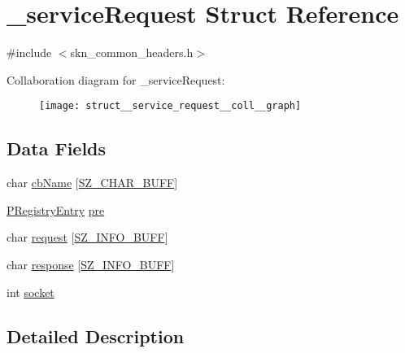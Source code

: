 \hypertarget{struct__service_request}{}\section{\+\_\+service\+Request Struct Reference}
\label{struct__service_request}


{\ttfamily \#include $<$skn\+\_\+common\+\_\+headers.\+h$>$}



Collaboration diagram for \+\_\+service\+Request\+:
\nopagebreak
\begin{figure}[H]
\begin{center}
\leavevmode
\texttt{[image: struct\_\_service\_request\_\_coll\_\_graph]}
\end{center}
\end{figure}
\subsection*{Data Fields}
\begin{DoxyCompactItemize}
\item 
char \hyperlink{struct__service_request_aab7831722782ba05f0c94087598a941e}{cb\+Name} \mbox{[}\hyperlink{skn__common__headers_8h_a8d2978ad614b0de81c60483e706d9306}{S\+Z\+\_\+\+C\+H\+A\+R\+\_\+\+B\+U\+F\+F}\mbox{]}
\item 
\hyperlink{skn__common__headers_8h_ac4f78e564b456af8e033cbc1275db23e}{P\+Registry\+Entry} \hyperlink{struct__service_request_acf8d45e7f9cb65b555217aae74cd72c5}{pre}
\item 
char \hyperlink{struct__service_request_ad347b2a07388ec9d9d33756f1a1ef235}{request} \mbox{[}\hyperlink{skn__common__headers_8h_a442d5e93bd9c9d8eb4532aba62b5f86c}{S\+Z\+\_\+\+I\+N\+F\+O\+\_\+\+B\+U\+F\+F}\mbox{]}
\item 
char \hyperlink{struct__service_request_ad4e98b9d21fad17ba82dba6a9b5f6562}{response} \mbox{[}\hyperlink{skn__common__headers_8h_a442d5e93bd9c9d8eb4532aba62b5f86c}{S\+Z\+\_\+\+I\+N\+F\+O\+\_\+\+B\+U\+F\+F}\mbox{]}
\item 
int \hyperlink{struct__service_request_aa867fef3928c7511f50a494662311d13}{socket}
\end{DoxyCompactItemize}


\subsection{Detailed Description}


